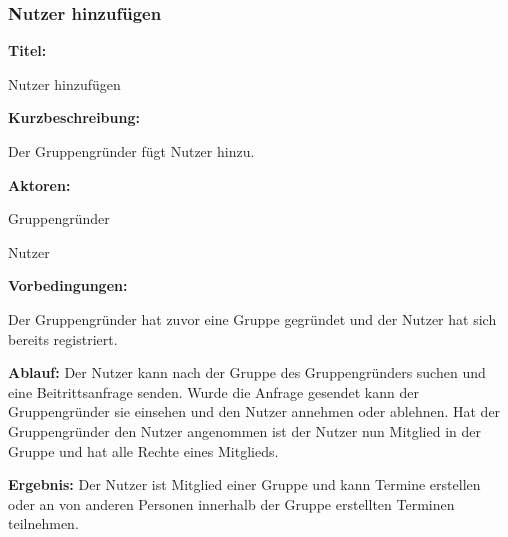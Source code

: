\documentclass{scrartcl}
\begin{document}
	\subsubsection{Nutzer hinzufügen}
	\begin{description}
		\item \textbf{Titel:}
		\begin{description}
			\item Nutzer hinzufügen
		\end{description}
		\item \textbf{Kurzbeschreibung:}
		\begin{description}
			\item Der Gruppengründer fügt Nutzer hinzu.
		\end{description}
		\item \textbf{Aktoren:}
		\begin{description}
			\item Gruppengründer
			\item Nutzer
		\end{description}
		\item \textbf{Vorbedingungen:}
		\begin{description}
			\item Der Gruppengründer hat zuvor eine Gruppe gegründet und der Nutzer hat sich bereits registriert.
		\end{description}
		\item \textbf{Ablauf:} \newline Der Nutzer kann nach der Gruppe des Gruppengründers suchen und eine Beitrittsanfrage senden. Wurde die Anfrage gesendet kann der Gruppengründer sie einsehen und den Nutzer annehmen oder ablehnen. Hat der Gruppengründer den Nutzer angenommen ist der Nutzer nun Mitglied in der Gruppe und hat alle Rechte eines Mitglieds.
		\item \textbf{Ergebnis:} \newline Der Nutzer ist Mitglied einer Gruppe und kann Termine erstellen oder an von anderen Personen innerhalb der Gruppe erstellten Terminen teilnehmen.
	\end{description}
	
	\newpage
	
\end{document}
